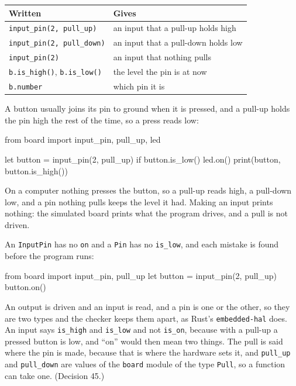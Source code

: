 \begin{center}
\begin{tabular}{ll}
\toprule
Written & Gives \\
\midrule
\verb|input_pin(2, pull_up)| & an input that a pull-up holds high \\
\verb|input_pin(2, pull_down)| & an input that a pull-down holds low \\
\verb|input_pin(2)| & an input that nothing pulls \\
\verb|b.is_high()|, \verb|b.is_low()| & the level the pin is at now \\
\verb|b.number| & which pin it is \\
\bottomrule
\end{tabular}
\end{center}

A button usually joins its pin to ground when it is pressed, and a
pull-up holds the pin high the rest of the time, so a press reads low:

\begin{zeno}
from board import input_pin, pull_up, led

let button = input_pin(2, pull_up)
if button.is_low() {
    led.on()
}
print(button, button.is_high())
\end{zeno}

On a computer nothing presses the button, so a pull-up reads high, a
pull-down low, and a pin nothing pulls keeps the level it had. Making
an input prints nothing: the simulated board prints what the program
drives, and a pull is not driven.

An \verb|InputPin| has no \verb|on| and a \verb|Pin| has no
\verb|is_low|, and each mistake is found before the program runs:

\begin{zeno}[fails=yes]
from board import input_pin, pull_up
let button = input_pin(2, pull_up)
button.on()
\end{zeno}

\begin{why}
An output is driven and an input is read, and a pin is one or the
other, so they are two types and the checker keeps them apart, as
Rust's \verb|embedded-hal| does. An input says \verb|is_high| and
\verb|is_low| and not \verb|is_on|, because with a pull-up a pressed
button is low, and ``on'' would then mean two things. The pull is said
where the pin is made, because that is where the hardware sets it, and
\verb|pull_up| and \verb|pull_down| are values of the \verb|board|
module of the type \verb|Pull|, so a function can take one.
(Decision 45.)
\end{why}


